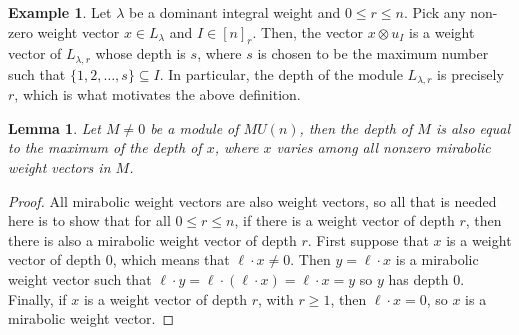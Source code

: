 \documentclass{amsart}
\numberwithin{equation}{section}
\theoremstyle{theorem}
\newtheorem{lemma}[theorem]{Lemma}
\theoremstyle{definition}
\newtheorem{example}[theorem]{Example}
\newcommand{\sub}{\subseteq}
\begin{document}
\begin{example} \label{ex:depth}
Let $\lambda$ be a dominant integral weight and $0\leq r\leq n$. Pick any non-zero weight vector $x\in L_{\lambda}$ and $I\in [n]_r$. Then, the vector $x\otimes u_I$ is a weight vector of $L_{\lambda,r}$ whose depth is $s$, where $s$ is chosen to be the maximum number such that $\{1,2,\dots, s\}\sub I$. In particular, the depth of the module $L_{\lambda,r}$ is precisely $r$, which is what motivates the above definition.
\end{example}

\begin{lemma}
Let $M\neq 0$ be a module of $MU(n)$, then the depth of $M$ is also equal to the maximum of the depth of $x$, where $x$ varies among all nonzero mirabolic weight vectors in $M$. 
\end{lemma}
\begin{proof}
All mirabolic weight vectors are also weight vectors, so all that is needed here is to show that for all $0\leq r\leq n$, if there is a weight vector of depth $r$, then there is also a mirabolic weight vector of depth $r$. First suppose that $x$ is a weight vector of depth $0$, which means that $\ell \cdot x\neq 0$. Then $y=\ell\cdot x$ is a mirabolic weight vector such that $\ell\cdot y=\ell\cdot(\ell\cdot x)=\ell\cdot x=y$ so $y$ has depth $0$. Finally, if $x$ is a weight vector of depth $r$, with $r\geq 1$, then $\ell\cdot x=0$, so $x$ is a mirabolic weight vector.
\end{proof}
\end{document}
